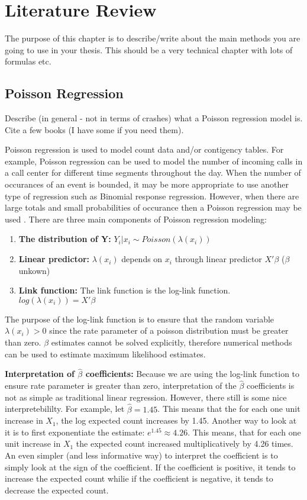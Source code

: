 \chapter{Literature Review}
The purpose of this chapter is to describe/write about the main methods you are going to use in your thesis.  This should be a very technical chapter with lots of formulas etc.

\section{Poisson Regression}
Describe (in general - not in terms of crashes) what a Poisson regression model is.  Cite a few books (I have some if you need them).

Poisson regression is used to model count data and/or contigency tables. For example, Poisson regression can be used to model the number of incoming calls in a call center for different time segments throughout the day. When the number of occurances of an event is bounded, it may be more appropriate to use another type of regression such as Binomial response regression. However, when there are large totals and small probabilities of occurance then a Poisson regression may be used \cite{faraway06}. There are three main components of Poisson regression modeling: \cite{weisberg05}

\begin{enumerate}
\item \textbf{The distribution of Y:} $ Y_i | x_i \sim Poisson(\lambda(x_i)) $
\item \textbf{Linear predictor:} $\lambda(x_i)$ depends on $x_i$ through linear predictor $X' \beta$ ($\beta$ unkown)
\item \textbf{Link function:} The link function is the log-link function. $log(\lambda(x_i))=X'\beta$
\end{enumerate}

The purpose of the log-link function is to ensure that the random variable $\lambda(x_i) > 0$ since the rate parameter of a poisson distribution must be greater than zero. $\beta$ estimates cannot be solved explicitly, therefore numerical methods can be used to estimate maximum likelihood estimates. 

\textbf{Interpretation of $\hat{\beta}$ coefficients:} Because we are using the log-link function to ensure rate parameter is greater than zero, interpretation of the $\hat{\beta}$ coefficients is not as simple as traditional linear regression. However, there still is some nice interpretebililty. For example, let $\hat{\beta}=1.45$. This means that the for each one unit increase in $X_1$, the log expected count increases by 1.45. Another way to look at it is to first exponentiate the estimate: $e^{1.45}\approx 4.26$. This means, that for each one unit increase in $X_1$ the expected count increased multiplicatively by 4.26 times. An even simpler (and less informative way) to interpret the coefficient is to simply look at the sign of the coefficient. If the coefficient is positive, it tends to increase the expected count whilie if the coefficient is negative, it tends to decrease the expected count.

